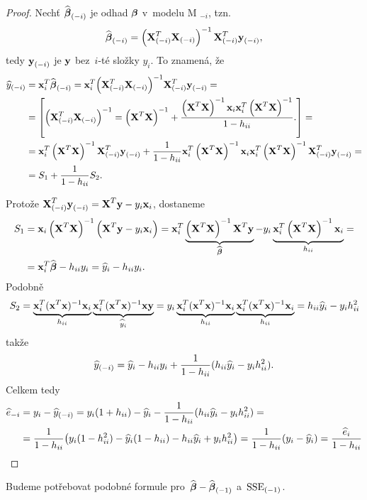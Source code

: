 \begin{proof}
	
	Nechť $\wbetab_{(-i)}$ je odhad $\betab$ v~modelu M $_{-i}$, tzn.
	 $$
	\wbetab_{(-i)} = \left(\X_{(-i)}^T \X_{(-i)} \right)^{-1} \X_{(-i)}^T \y_{(-i)},
	 $$
	tedy $\y_{(-i)}$ je $\y$ bez~$i$-té složky $y_i$. To znamená, že
	\begin{align*}
	\hy_{(-i)} & = \x_i^T \wbetab_{(-i)} = \x_i^T \inv{\left(\X_{(-i)}^T \X_{(-i)} \right)} \X_{(-i)}^T \y_{(-i)} = \\
	 & = \left[\left(\X_{(-i)}^T \X_{(-i)} \right)^{-1} = \XtX + \frac{\XtX \x_i \x_i^T \XtX}{1 - \hii}. \right] = \\
	 & = \x_i^T \XtX \X_{(-i)}^T \y_{(-i)} + \frac{1}{1 - \hii} \x_i^T \XtX \x_i \x_i^T \XtX \X_{(-i)}^T \y_{(-i)} = \\
	 & = S_1 + \frac{1}{1-\hii} S_2.
	\end{align*}
	
	Protože $\X_{(-i)}^T \y_{(-i)} = \X^T \y - y_i \x_i$, dostaneme
	\begin{align*}
	S_1 & = \x_i \XtX \left(\X^T \y - y_i \x_i \right) = \x_i^T \underbrace{\XtX \X^T \y}_{\wbetab} - y_i \underbrace{\x_i^T \XtX \x_i}_{\hii} = \\
	& = \x_i^T \wbetab - \hii y_i = \hy_i - \hii y_i.
	\end{align*}
	Podobně	
	 $$ S_2 = \underbrace{\textbf{x}_i^T(\textbf{x}^T\textbf{x})^{-1}\textbf{x}_i}_{h_{ii}}\underbrace{\textbf{x}_i^T(\textbf{x}^T\textbf{x})^{-1}\textbf{x}\textbf{y}}_{\hyi} = y_i\underbrace{\textbf{x}_i^T(\textbf{x}^T\textbf{x})^{-1}\textbf{x}_i}_{h_{ii}}\underbrace{\textbf{x}_i^T(\textbf{x}^T\textbf{x})^{-1}\textbf{x}_i}_{h_{ii}} = h_{ii}\hyi-y_ih_{ii}^2 $$
	takže
	 $$ \hy_{(-i)} = \hyi-h_{ii}y_i+\frac{1}{1-h_{ii}}(h_{ii}\hyi-y_ih_{ii}^2). $$
	Celkem tedy
	\begin{align*}
	\he_{-i} & = y_i-\hy_{(-i)} = y_i(1+h_{ii})-\hyi-\frac{1}{1-h_{ii}}(h_{ii}\hyi-y_ih_{ii}^2) = \\
	& = \frac{1}{1-h_{ii}}\big(y_i(1-h_{ii}^2)-\hyi(1-h_{ii})-h_{ii}\hyi+y_ih_{ii}^2\big) = \frac{1}{1-h_{ii}}(y_i-\hyi) = \frac{\hei}{1-h_{ii}}
	\end{align*}
\end{proof}Budeme potřebovat podobné formule pro~$\wbetab-\wbetab_{(-1)}$ a~$\mini{\SSE}$.

